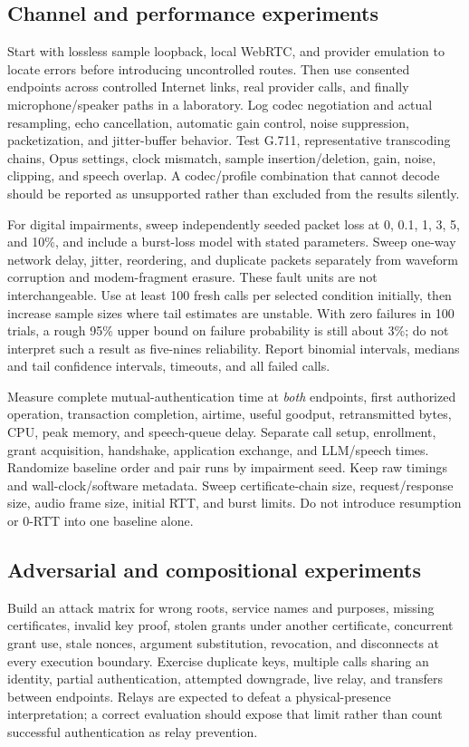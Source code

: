 \subsection{Channel and performance experiments}
Start with lossless sample loopback, local WebRTC, and provider emulation to
locate errors before introducing uncontrolled routes. Then use consented
endpoints across controlled Internet links, real provider calls, and finally
microphone/speaker paths in a laboratory. Log codec negotiation and actual
resampling, echo cancellation, automatic gain control, noise suppression,
packetization, and jitter-buffer behavior. Test G.711, representative
transcoding chains, Opus settings, clock mismatch, sample insertion/deletion,
gain, noise, clipping, and speech overlap. A codec/profile combination that
cannot decode should be reported as unsupported rather than excluded from
the results silently.

For digital impairments, sweep independently seeded packet loss at 0, 0.1, 1,
3, 5, and 10\%, and include a burst-loss model with stated parameters. Sweep
one-way network delay, jitter, reordering, and duplicate packets separately
from waveform corruption and modem-fragment erasure. These fault units are
not interchangeable. Use at least 100 fresh calls per selected condition
initially, then increase sample sizes where tail estimates are unstable.
With zero failures in 100 trials, a rough 95\% upper bound on failure
probability is still about 3\%; do not interpret such a result as five-nines
reliability. Report binomial intervals, medians and tail confidence intervals,
timeouts, and all failed calls.

Measure complete mutual-authentication time at \emph{both} endpoints, first
authorized operation, transaction completion, airtime, useful goodput,
retransmitted bytes, CPU, peak memory, and speech-queue delay. Separate call
setup, enrollment, grant acquisition, handshake, application exchange, and
LLM/speech times. Randomize baseline order and pair runs by impairment seed.
Keep raw timings and wall-clock/software metadata. Sweep certificate-chain
size, request/response size, audio frame size, initial RTT, and burst limits.
Do not introduce resumption or 0-RTT into one baseline alone.

\subsection{Adversarial and compositional experiments}
Build an attack matrix for wrong roots, service names and purposes, missing
certificates, invalid key proof, stolen grants under another certificate,
concurrent grant use, stale nonces, argument substitution, revocation, and
disconnects at every execution boundary. Exercise duplicate keys, multiple
calls sharing an identity, partial authentication, attempted downgrade, live
relay, and transfers between endpoints. Relays are expected to defeat a
physical-presence interpretation; a correct evaluation should expose that
limit rather than count successful authentication as relay prevention.

